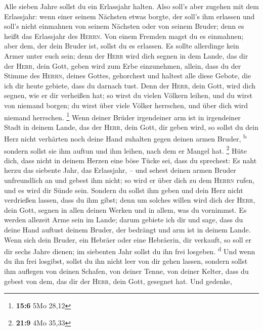  Alle sieben Jahre sollst du ein Erlassjahr halten.
 Also soll's aber zugehen mit dem Erlassjahr: wenn einer
seinem Nächsten etwas borgte, der soll's ihm erlassen und soll's nicht
einmahnen von seinem Nächsten oder von seinem Bruder; denn es heißt das
Erlassjahr des \textsc{Herrn}.  Von einem Fremden magst du
es einmahnen; aber dem, der dein Bruder ist, sollst du es erlassen.
 Es sollte allerdinge kein Armer unter euch sein; denn der
\textsc{Herr} wird dich segnen in dem Lande, das dir der \textsc{Herr},
dein Gott, geben wird zum Erbe einzunehmen,  allein, dass
du der Stimme des \textsc{Herrn}, deines Gottes, gehorchest und haltest
alle diese Gebote, die ich dir heute gebiete, dass du darnach tust.
 Denn der \textsc{Herr}, dein Gott, wird dich segnen, wie
er dir verheißen hat; so wirst du vielen Völkern leihen, und du wirst
von niemand borgen; du wirst über viele Völker herrschen, und über dich
wird niemand herrschen. \footnote{\textbf{15:6} 5Mo 28,12}
 Wenn deiner Brüder irgendeiner arm ist in irgendeiner
Stadt in deinem Lande, das der \textsc{Herr}, dein Gott, dir geben wird,
so sollst du dein Herz nicht verhärten noch deine Hand zuhalten gegen
deinen armen Bruder, \textsuperscript{b}  sondern sollst
sie ihm auftun und ihm leihen, nach dem er Mangel hat. \footnote{\textbf{21:9}
  4Mo 35,33}  Hüte dich, dass nicht in deinem Herzen eine
böse Tücke sei, dass du sprechest: Es naht herzu das siebente Jahr, das
Erlassjahr, -- und sehest deinen armen Bruder unfreundlich an und gebest
ihm nicht; so wird er über dich zu dem \textsc{Herrn} rufen, und es wird
dir Sünde sein.  Sondern du sollst ihm geben und dein
Herz nicht verdrießen lassen, dass du ihm gibst; denn um solches willen
wird dich der \textsc{Herr}, dein Gott, segnen in allen deinen Werken
und in allem, was du vornimmst.  Es werden allezeit Arme
sein im Lande; darum gebiete ich dir und sage, dass du deine Hand
auftust deinem Bruder, der bedrängt und arm ist in deinem Lande.
 Wenn sich dein Bruder, ein Hebräer oder eine Hebräerin,
dir verkauft, so soll er dir sechs Jahre dienen; im siebenten Jahr
sollst du ihn frei losgeben. \textsuperscript{d}  Und
wenn du ihn frei losgibst, sollst du ihn nicht leer von dir gehen
lassen,  sondern sollst ihm auflegen von deinen Schafen,
von deiner Tenne, von deiner Kelter, dass du gebest von dem, das dir der
\textsc{Herr}, dein Gott, gesegnet hat.  Und gedenke,
